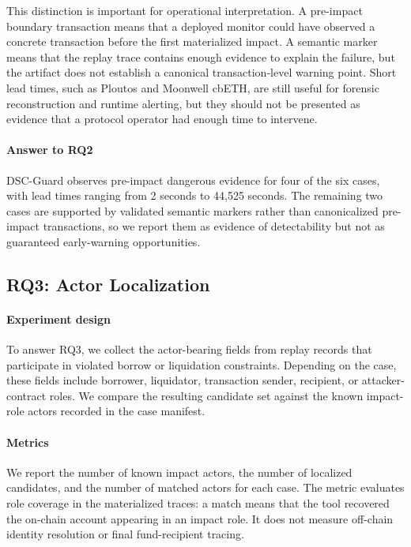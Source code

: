 \documentclass[final,5p]{elsarticle}
\newcommand{\tool}{DSC-Guard\xspace}
\begin{document}
This distinction is important for operational interpretation.
A pre-impact boundary transaction means that a deployed monitor could have observed a concrete transaction before the first materialized impact.
A semantic marker means that the replay trace contains enough evidence to explain the failure, but the artifact does not establish a canonical transaction-level warning point.
Short lead times, such as Ploutos and Moonwell cbETH, are still useful for forensic reconstruction and runtime alerting, but they should not be presented as evidence that a protocol operator had enough time to intervene.

\paragraph{Answer to RQ2}
\tool observes pre-impact dangerous evidence for four of the six cases, with lead times ranging from 2 seconds to 44,525 seconds.
The remaining two cases are supported by validated semantic markers rather than canonicalized pre-impact transactions, so we report them as evidence of detectability but not as guaranteed early-warning opportunities.

\subsection{RQ3: Actor Localization}

\paragraph{Experiment design}
To answer RQ3, we collect the actor-bearing fields from replay records that participate in violated borrow or liquidation constraints.
Depending on the case, these fields include borrower, liquidator, transaction sender, recipient, or attacker-contract roles.
We compare the resulting candidate set against the known impact-role actors recorded in the case manifest.

\paragraph{Metrics}
We report the number of known impact actors, the number of localized candidates, and the number of matched actors for each case.
The metric evaluates role coverage in the materialized traces: a match means that the tool recovered the on-chain account appearing in an impact role.
It does not measure off-chain identity resolution or final fund-recipient tracing.
\end{document}
